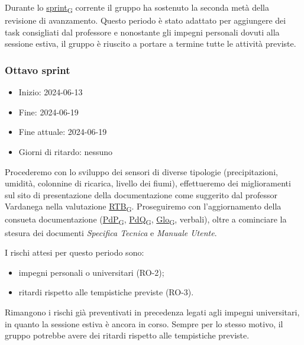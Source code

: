 Durante lo \href{https://7last.github.io/docs/pb/documentazione-interna/glossario\#sprint}{sprint\textsubscript{G}} corrente il gruppo ha sostenuto la seconda metà della revisione di avanzamento. Questo periodo è stato adattato per aggiungere dei task consigliati dal professore e nonostante gli impegni personali dovuti alla sessione estiva, il gruppo è riuscito a portare a termine tutte le attività previste.


\newpage
\subsubsection{Ottavo sprint}
\begin{itemize}
	\item Inizio: 2024-06-13
	\item Fine: 2024-06-19
	\item Fine attuale: 2024-06-19
	\item Giorni di ritardo: nessuno
\end{itemize}

Procederemo con lo sviluppo dei sensori di diverse tipologie (precipitazioni, umidità, colonnine di ricarica, livello dei fiumi), effettueremo dei miglioramenti sul sito di presentazione della documentazione come suggerito dal professor Vardanega nella valutazione \href{https://7last.github.io/docs/pb/documentazione-interna/glossario\#requirements-and-technology-baseline}{RTB\textsubscript{G}}. Proseguiremo con l'aggiornamento della consueta documentazione (\href{https://7last.github.io/docs/pb/documentazione-interna/glossario\#piano-di-progetto}{PdP\textsubscript{G}}, \href{https://7last.github.io/docs/pb/documentazione-interna/glossario\#piano-di-qualifica}{PdQ\textsubscript{G}}, \href{https://7last.github.io/docs/pb/documentazione-interna/glossario\#glossario}{Glo\textsubscript{G}}, verbali), oltre a cominciare la stesura dei documenti \textit{Specifica Tecnica} e \textit{Manuale Utente}.

I rischi attesi per questo periodo sono:
\begin{itemize}
	\item impegni personali o universitari (RO-2);
	\item ritardi rispetto alle tempistiche previste (RO-3).
\end{itemize}
Rimangono i rischi già preventivati in precedenza legati agli impegni universitari, in quanto la sessione estiva è ancora in corso. Sempre per lo stesso motivo, il gruppo potrebbe avere dei ritardi rispetto alle tempistiche previste.

